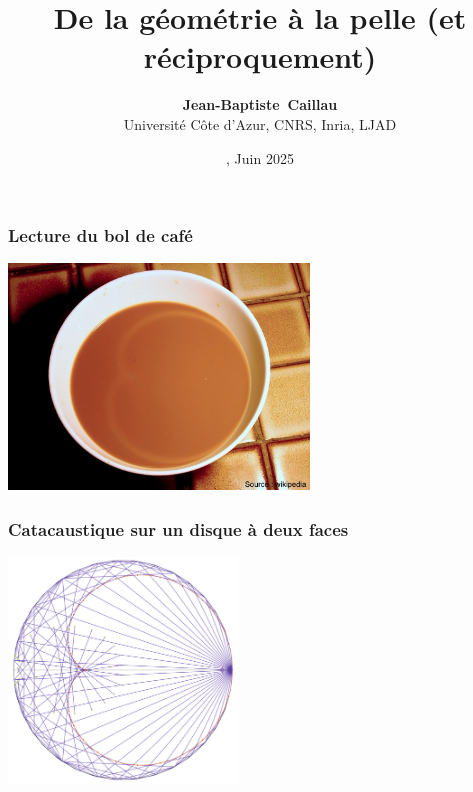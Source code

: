 \documentclass[9pt]{beamer}
\title{\Large \bf De la g\'eom\'etrie \`a la pelle (et r\'eciproquement)}
\author{\textbf{Jean-Baptiste~Caillau}\\
Universit\'e C\^ote d'Azur, CNRS, Inria, LJAD}
\date{\textbf{\emphc{Lyc\'ee Massena}}, Juin 2025}
\begin{document}

\begin{frame}
\frametitle{\bf Lecture du bol de caf\'e}
 
\centering \includegraphics[height=6.0cm]{bol}

\end{frame}

\begin{frame}
\frametitle{\bf Catacaustique sur un disque \`a deux faces}
 
\centering \includegraphics[height=6.0cm]{cata}

\end{frame}
\end{document}
